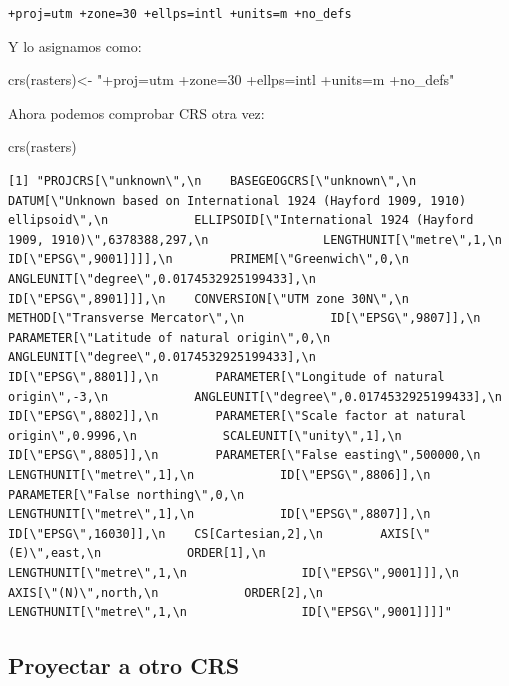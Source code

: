 \documentclass[
  letterpaper,
  DIV=11,
  numbers=noendperiod]{scrreprt}
\newenvironment{Shaded}{\begin{snugshade}}{\end{snugshade}}
\newcommand{\FunctionTok}[1]{\textcolor[rgb]{0.28,0.35,0.67}{#1}}
\newcommand{\NormalTok}[1]{\textcolor[rgb]{0.00,0.23,0.31}{#1}}
\newcommand{\OtherTok}[1]{\textcolor[rgb]{0.00,0.23,0.31}{#1}}
\newcommand{\StringTok}[1]{\textcolor[rgb]{0.13,0.47,0.30}{#1}}
\begin{document}
\texttt{+proj=utm\ +zone=30\ +ellps=intl\ +units=m\ +no\_defs}

Y lo asignamos como:

\begin{Shaded}
\begin{Highlighting}[]
\FunctionTok{crs}\NormalTok{(rasters)}\OtherTok{\textless{}{-}} \StringTok{"+proj=utm +zone=30 +ellps=intl +units=m +no\_defs"}
\end{Highlighting}
\end{Shaded}

Ahora podemos comprobar CRS otra vez:

\begin{Shaded}
\begin{Highlighting}[]
\FunctionTok{crs}\NormalTok{(rasters)}
\end{Highlighting}
\end{Shaded}

\begin{verbatim}
[1] "PROJCRS[\"unknown\",\n    BASEGEOGCRS[\"unknown\",\n        DATUM[\"Unknown based on International 1924 (Hayford 1909, 1910) ellipsoid\",\n            ELLIPSOID[\"International 1924 (Hayford 1909, 1910)\",6378388,297,\n                LENGTHUNIT[\"metre\",1,\n                    ID[\"EPSG\",9001]]]],\n        PRIMEM[\"Greenwich\",0,\n            ANGLEUNIT[\"degree\",0.0174532925199433],\n            ID[\"EPSG\",8901]]],\n    CONVERSION[\"UTM zone 30N\",\n        METHOD[\"Transverse Mercator\",\n            ID[\"EPSG\",9807]],\n        PARAMETER[\"Latitude of natural origin\",0,\n            ANGLEUNIT[\"degree\",0.0174532925199433],\n            ID[\"EPSG\",8801]],\n        PARAMETER[\"Longitude of natural origin\",-3,\n            ANGLEUNIT[\"degree\",0.0174532925199433],\n            ID[\"EPSG\",8802]],\n        PARAMETER[\"Scale factor at natural origin\",0.9996,\n            SCALEUNIT[\"unity\",1],\n            ID[\"EPSG\",8805]],\n        PARAMETER[\"False easting\",500000,\n            LENGTHUNIT[\"metre\",1],\n            ID[\"EPSG\",8806]],\n        PARAMETER[\"False northing\",0,\n            LENGTHUNIT[\"metre\",1],\n            ID[\"EPSG\",8807]],\n        ID[\"EPSG\",16030]],\n    CS[Cartesian,2],\n        AXIS[\"(E)\",east,\n            ORDER[1],\n            LENGTHUNIT[\"metre\",1,\n                ID[\"EPSG\",9001]]],\n        AXIS[\"(N)\",north,\n            ORDER[2],\n            LENGTHUNIT[\"metre\",1,\n                ID[\"EPSG\",9001]]]]"
\end{verbatim}

\hypertarget{proyectar-a-otro-crs}{%
\subsection{Proyectar a otro CRS}\label{proyectar-a-otro-crs}}
\end{document}
